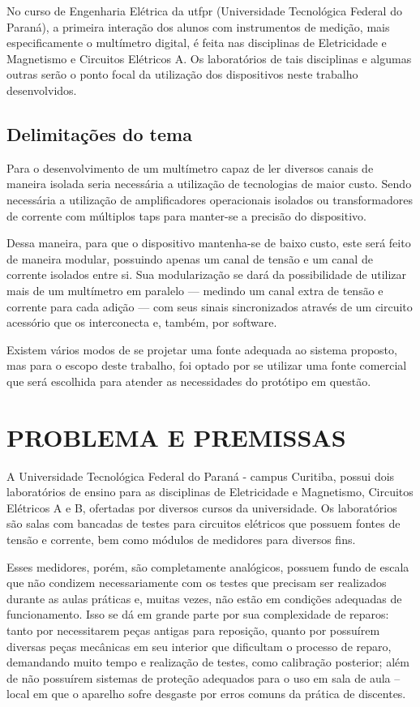 No curso de Engenharia Elétrica da \gls{utfpr} (Universidade Tecnológica Federal do Paraná), a primeira interação dos alunos com instrumentos de medição, mais especificamente o multímetro digital, é feita nas disciplinas de Eletricidade e Magnetismo e Circuitos Elétricos A. Os laboratórios de tais disciplinas e algumas outras serão o ponto focal da utilização dos dispositivos neste trabalho desenvolvidos.

\subsection{Delimitações do tema}\label{subsec:del-tema}
Para o desenvolvimento de um multímetro capaz de ler diversos canais de maneira isolada seria necessária a utilização de tecnologias de maior custo. Sendo necessária a utilização de amplificadores operacionais isolados ou transformadores de corrente com múltiplos taps para manter-se a precisão do dispositivo.

Dessa maneira, para que o dispositivo mantenha-se de baixo custo, este será feito de maneira modular, possuindo apenas um canal de tensão e um canal de corrente isolados entre si. Sua modularização se dará da possibilidade de utilizar mais de um multímetro em paralelo --- medindo um canal extra de tensão e corrente para cada adição --- com seus sinais sincronizados através de um circuito acessório que os interconecta e, também, por software.

Existem vários modos de se projetar uma fonte adequada ao sistema proposto, mas para o escopo deste trabalho, foi optado por se utilizar uma fonte comercial que será escolhida para atender as necessidades do protótipo em questão.

\section{PROBLEMA E PREMISSAS}\label{sec:probpremiss}
A Universidade Tecnológica Federal do Paraná - campus Curitiba, possui dois laboratórios de ensino para as disciplinas de Eletricidade e Magnetismo, Circuitos Elétricos A e B, ofertadas por diversos cursos da universidade. Os laboratórios são salas com bancadas de testes para circuitos elétricos que possuem fontes de tensão e corrente, bem como módulos de medidores para diversos fins.

Esses medidores, porém, são completamente analógicos, possuem fundo de escala que não condizem necessariamente com os testes que precisam ser realizados durante as aulas práticas e, muitas vezes, não estão em condições adequadas de funcionamento. Isso se dá em grande parte por sua complexidade de reparos: tanto por necessitarem peças antigas para reposição, quanto por possuírem diversas peças mecânicas em seu interior que dificultam o processo de reparo, demandando muito tempo e realização de testes, como calibração posterior; além de não possuírem sistemas de proteção adequados para o uso em sala de aula – local em que o aparelho sofre desgaste por erros comuns da prática de discentes.


